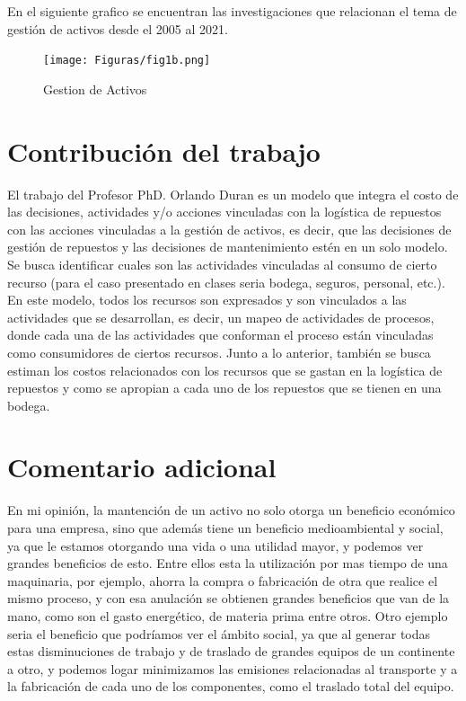 \documentclass[]{article}
\begin{document}
En el siguiente grafico se encuentran las investigaciones que relacionan el tema de gestión de activos desde el 2005 al 2021.

\begin{figure}[!h]
    \centering
    \texttt{[image: Figuras/fig1b.png]}
    \caption{Gestion de Activos}
    \label{fig:my_label}
\end{figure}

\hypertarget{contribucion-del-trabajo-identificacion-del-aporte-que-se-hace}{%
\section{Contribución del trabajo}
\label{contribucion-del-trabajo-identificacion-del-aporte-que-se-hace}}
El trabajo del Profesor PhD. Orlando Duran es un modelo que integra el costo de las decisiones, actividades y/o acciones vinculadas con la logística de repuestos con las acciones vinculadas a la gestión de activos, es decir, que las decisiones de gestión de repuestos y las decisiones de mantenimiento estén en un solo modelo.
Se busca identificar cuales son las actividades vinculadas al consumo de cierto recurso (para el caso presentado en clases seria bodega, seguros, personal, etc.). En este modelo, todos los recursos son expresados y son vinculados a las actividades que se desarrollan, es decir, un mapeo de actividades de procesos, donde cada una de las actividades que conforman el proceso están vinculadas como consumidores de ciertos recursos.
Junto a lo anterior, también se busca estiman los costos relacionados con los recursos que se gastan en la logística de repuestos y como se apropian a cada uno de los repuestos que se tienen en una bodega. 



\hypertarget{comentario-adicional}{%
\section{Comentario adicional}
\label{comentario-adicional}}
En mi opinión, la mantención de un activo no solo otorga un beneficio económico para una empresa, sino que además tiene un beneficio medioambiental y social, ya que le estamos otorgando una vida o una utilidad mayor, y podemos ver grandes beneficios de esto. Entre ellos esta la utilización por mas tiempo de una maquinaria, por ejemplo, ahorra la compra o fabricación de otra que realice el mismo proceso, y con esa anulación se obtienen grandes beneficios que van de la mano, como son el gasto energético, de materia prima entre otros. Otro ejemplo seria el  beneficio que podríamos ver el ámbito social, ya que al generar todas estas disminuciones de trabajo y de traslado de grandes equipos de un continente a otro, y podemos logar  minimizamos las emisiones relacionadas al transporte y a la fabricación de cada uno de los componentes, como el traslado total del equipo.








\end{document}
